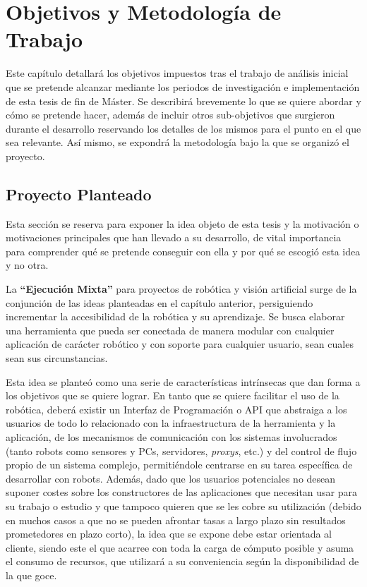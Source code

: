 \chapter{Objetivos y Metodología de Trabajo}

Este capítulo detallará los objetivos impuestos tras el trabajo de análisis inicial que se pretende alcanzar mediante los periodos de investigación e implementación de esta tesis de fin de Máster. Se describirá brevemente lo que se quiere abordar y cómo se pretende hacer, además de incluir otros sub-objetivos que surgieron durante el desarrollo reservando los detalles de los mismos para el punto en el que sea relevante. Así mismo, se expondrá la metodología bajo la que se organizó el proyecto.

\section{Proyecto Planteado}

Esta sección se reserva para exponer la idea objeto de esta tesis y la motivación o motivaciones principales que han llevado a su desarrollo, de vital importancia para comprender qué se pretende conseguir con ella y por qué se escogió esta idea y no otra.

La \textbf{``Ejecución Mixta''} para proyectos de robótica y visión artificial surge de la conjunción de las ideas planteadas en el capítulo anterior, persiguiendo incrementar la accesibilidad de la robótica y su aprendizaje. Se busca elaborar una herramienta que pueda ser conectada de manera modular con cualquier aplicación de carácter robótico y con soporte para cualquier usuario, sean cuales sean sus circunstancias.

Esta idea se planteó como una serie de características intrínsecas que dan forma a los objetivos que se quiere lograr. En tanto que se quiere facilitar el uso de la robótica, deberá existir un Interfaz de Programación o API que abstraiga a los usuarios de todo lo relacionado con la infraestructura de la herramienta y la aplicación, de los mecanismos de comunicación con los sistemas involucrados (tanto robots como sensores y PCs, servidores, \textit{proxys}, etc.) y del control de flujo propio de un sistema complejo, permitiéndole centrarse en su tarea específica de desarrollar con robots. Además, dado que los usuarios potenciales no desean suponer costes sobre los constructores de las aplicaciones que necesitan usar para su trabajo o estudio y que tampoco quieren que se les cobre su utilización (debido en muchos casos a que no se pueden afrontar tasas a largo plazo sin resultados prometedores en plazo corto), la idea que se expone debe estar orientada al cliente, siendo este el que acarree con toda la carga de cómputo posible y asuma el consumo de recursos, que utilizará a su conveniencia según la disponibilidad de la que goce.

